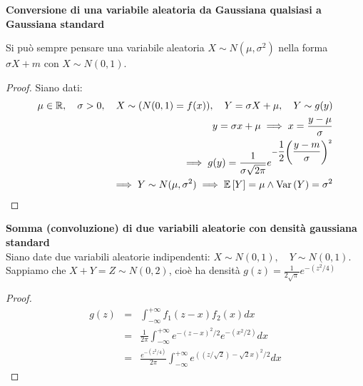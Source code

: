 \begin{defn}
    \textbf{Conversione di una variabile aleatoria da Gaussiana qualsiasi a Gaussiana standard} \\
    \begin{prop}
        Si può sempre pensare una variabile aleatoria $X \sim N(\mu, \sigma^2)$
        nella forma $\sigma X + m$ con $X \sim N(0, 1)$.
    \end{prop}

    \begin{proof}
        Siano dati:
        \begin{equation*}
            \begin{aligned}
                \mu \in \mathbb{R}, \quad \sigma > 0, \quad X \sim (N(0,1) = f(x)), \quad Y = \sigma X + \mu, \quad Y \sim g(y)\\
                y = \sigma x + \mu \implies x = \dfrac{y-\mu}{\sigma}\\
                \implies g(y) = \frac{1}{\sigma \sqrt{2 \pi}} e^{- \dfrac{1}{2} \left( \dfrac{y - m}{\sigma}\right)^2 }\\
                \implies Y \sim N(\mu, \sigma^2) \implies \mathbb{E}\left[Y\right] = \mu \land \text{Var}\left(Y\right) = \sigma^2
            \end{aligned}
        \end{equation*}
    \end{proof}

\end{defn}

\begin{defn}
    \textbf{Somma (convoluzione) di due variabili aleatorie con densità gaussiana standard} \\
    Siano date due variabili aleatorie indipendenti: $X \sim N(0, 1),\quad Y
    \sim N(0, 1) $. Sappiamo che $X + Y = Z \sim N(0, 2)$, cioè ha densità $g(z)
    = \frac{1}{2\sqrt{\pi}} e^{-(z^2/4)}$

    \begin{proof}
        \begin{eqnarray*}
                g(z) &=& \int_{-\infty}^{+\infty} f_1(z - x) f_2(x) dx \\
                &=& \frac{1}{2\pi} \int_{-\infty}^{+\infty} e^{-(z -x)^2/2}
                e^{-(x^2/2)} dx \\
                &=& \frac{e^{-(z^2/4)}}{2\pi} \int_{-\infty}^{+\infty}
                e^{((z/\sqrt{2}) - \sqrt{2}x)^2/2} dx
        \end{eqnarray*}
    \end{proof}
\end{defn}






